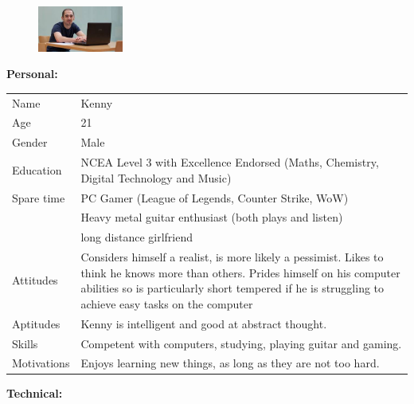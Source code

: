 \begin{figure}[h]
	\centering
	\includegraphics[width = 0.25\textwidth]{images/index.jpg}
\end{figure}
\noindent
\textbf{Personal: }\\
\begin{tabularx}{\textwidth}{l X}
	Name & Kenny\\
	Age & 21\\
	Gender & Male\\
	Education & NCEA Level 3 with Excellence Endorsed (Maths, Chemistry, Digital Technology and Music)\\
	Spare time & PC Gamer (League of Legends, Counter Strike, WoW)\\
	& Heavy metal guitar enthusiast (both plays and listen)\\
	& long distance girlfriend\\
	Attitudes & Considers himself a realist, is more likely a pessimist. Likes to think he knows more than others. Prides himself on his computer abilities so is particularly short tempered  if he is struggling to achieve easy tasks on the computer\\
	Aptitudes & Kenny is intelligent and good at abstract thought.\\
	Skills & Competent with computers, studying, playing guitar and gaming.\\
	Motivations & Enjoys learning new things, as long as they are not too hard. 
	
\end{tabularx}
\noindent
\textbf{Technical: }\\
